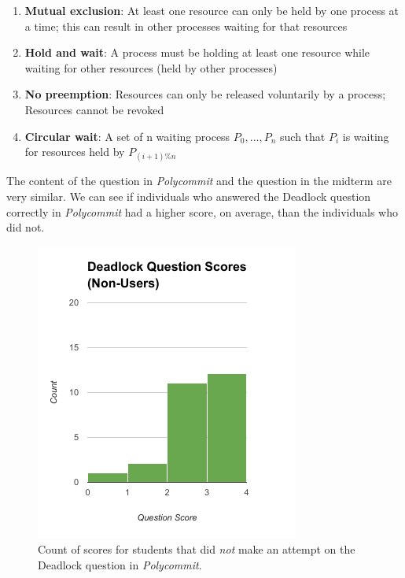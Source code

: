 \begin{enumerate}
	\item \textbf{Mutual exclusion}: At least one resource can only be
	held by one process at a time; this can result in other
	processes waiting for that resources
	\item \textbf{Hold and wait}: A process must be holding at least one
	resource while waiting for other resources (held by other
	processes)
	\item \textbf{No preemption}: Resources can only be released
	voluntarily by a process; Resources cannot be revoked
	\item \textbf{Circular wait}: A set of n waiting process $ {P_0, ..., P_n} $
	such that $ P_i $ is waiting for resources held by $ P_{(i+1)\%n} $
\end{enumerate}

\par The content of the question in \textit{Polycommit} and the question in the midterm are very similar. We can see if individuals who answered the Deadlock question correctly in \textit{Polycommit} had a higher score, on average, than the individuals who did not.

\begin{figure}[th!]
	\includegraphics[width=0.5\linewidth]{figures/deadlock-nonusers}
	\caption{Count of scores for students that did \textit{not} make an attempt on the Deadlock question in \textit{Polycommit}.}
	\label{fig:deadlock-no}
\end{figure}

